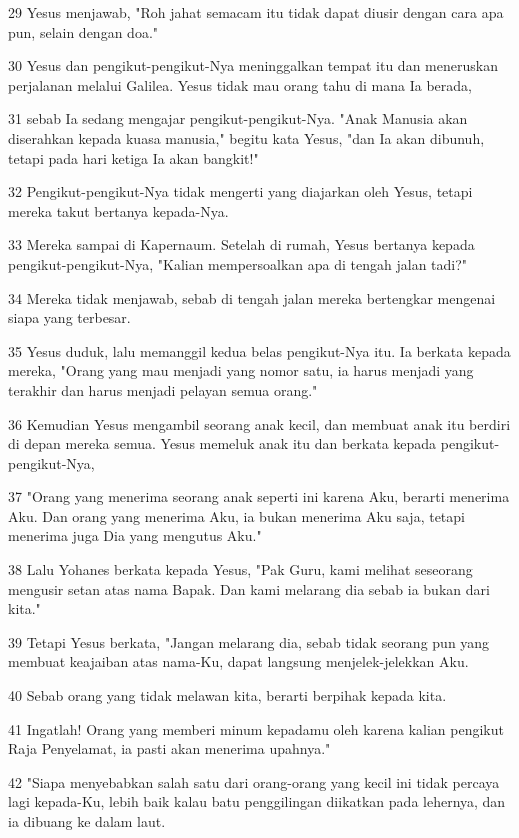\par 29 Yesus menjawab, "Roh jahat semacam itu tidak dapat diusir dengan cara apa pun, selain dengan doa."
\par 30 Yesus dan pengikut-pengikut-Nya meninggalkan tempat itu dan meneruskan perjalanan melalui Galilea. Yesus tidak mau orang tahu di mana Ia berada,
\par 31 sebab Ia sedang mengajar pengikut-pengikut-Nya. "Anak Manusia akan diserahkan kepada kuasa manusia," begitu kata Yesus, "dan Ia akan dibunuh, tetapi pada hari ketiga Ia akan bangkit!"
\par 32 Pengikut-pengikut-Nya tidak mengerti yang diajarkan oleh Yesus, tetapi mereka takut bertanya kepada-Nya.
\par 33 Mereka sampai di Kapernaum. Setelah di rumah, Yesus bertanya kepada pengikut-pengikut-Nya, "Kalian mempersoalkan apa di tengah jalan tadi?"
\par 34 Mereka tidak menjawab, sebab di tengah jalan mereka bertengkar mengenai siapa yang terbesar.
\par 35 Yesus duduk, lalu memanggil kedua belas pengikut-Nya itu. Ia berkata kepada mereka, "Orang yang mau menjadi yang nomor satu, ia harus menjadi yang terakhir dan harus menjadi pelayan semua orang."
\par 36 Kemudian Yesus mengambil seorang anak kecil, dan membuat anak itu berdiri di depan mereka semua. Yesus memeluk anak itu dan berkata kepada pengikut-pengikut-Nya,
\par 37 "Orang yang menerima seorang anak seperti ini karena Aku, berarti menerima Aku. Dan orang yang menerima Aku, ia bukan menerima Aku saja, tetapi menerima juga Dia yang mengutus Aku."
\par 38 Lalu Yohanes berkata kepada Yesus, "Pak Guru, kami melihat seseorang mengusir setan atas nama Bapak. Dan kami melarang dia sebab ia bukan dari kita."
\par 39 Tetapi Yesus berkata, "Jangan melarang dia, sebab tidak seorang pun yang membuat keajaiban atas nama-Ku, dapat langsung menjelek-jelekkan Aku.
\par 40 Sebab orang yang tidak melawan kita, berarti berpihak kepada kita.
\par 41 Ingatlah! Orang yang memberi minum kepadamu oleh karena kalian pengikut Raja Penyelamat, ia pasti akan menerima upahnya."
\par 42 "Siapa menyebabkan salah satu dari orang-orang yang kecil ini tidak percaya lagi kepada-Ku, lebih baik kalau batu penggilingan diikatkan pada lehernya, dan ia dibuang ke dalam laut.
